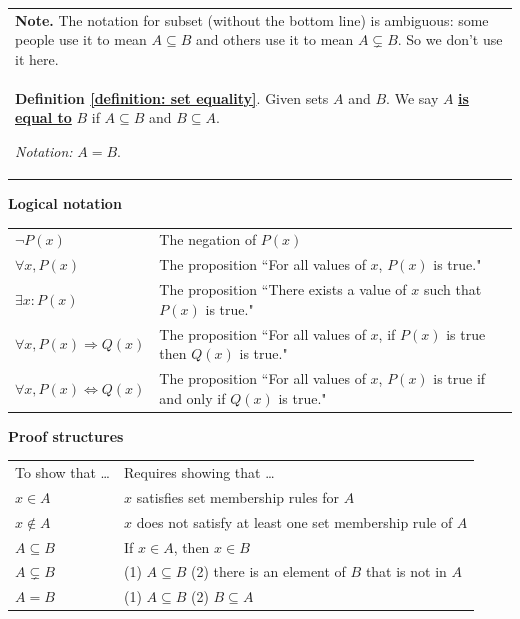 \documentclass[11pt]{article}
\renewcommand\subset\subseteq
\renewcommand\emph[1]{\underline{\bf{#1}}} %
\theoremstyle{definition}
\begin{document}
\vspace*{8pt}

\begin{tabular}{L{6in}}{\bf Note.} The notation for subset (without the bottom line) is ambiguous: some people use it to mean $A \subseteq B$ and others use it to mean $A \subsetneq B$. So we don't use it here. \\ 

 {\bf Definition \ref{definition: set equality}}.
Given sets $A$ and $B$. We say $A$ \emph{is equal to} $B$ if $A\subset B$ and $B\subset A$. 

{\it Notation:} $A=B$.
\end{tabular}

\vfill 
{\bf Logical notation}

\begin{tabular}{L{1in}L{5in}}
$\neg P(x)$ & The negation of $P(x)$ \\

$\forall x, P(x)$ & The proposition ``For all values of $x$, $P(x)$ is true." \\

$\exists x: P(x)$ & The proposition ``There exists a value of $x$ such that $P(x)$ is true." \\

$\forall x, P(x) \Rightarrow Q(x)$ & The proposition ``For all values of $x$, if $P(x)$ is true then $Q(x)$ is true."\\

$\forall x, P(x) \Leftrightarrow Q(x)$ & The proposition ``For all values of $x$, $P(x)$ is true if and only if $Q(x)$ is true." 
\end{tabular}


\vfill
{\bf Proof structures}

\begin{tabular}{L{1in}L{5in}}
To show that \dots & Requires showing that \dots \\
{\bf $x\in A$} & $x$ satisfies set membership rules for $A$ \\
{\bf $x\notin A$} & $x$ does not satisfy at least one set membership rule of $A$ \\ 
{\bf $A\subset B$} & If $x\in A$, then $x\in B$ \\ 
{\bf $A\subsetneq B$} & (1) $A\subset B$ \quad (2) there is an element of $B$ that is not in $A$ \\ 
{\bf $A=B$} & (1) $A\subset B$ \quad (2) $B\subset A$
\end{tabular}
\end{document}
